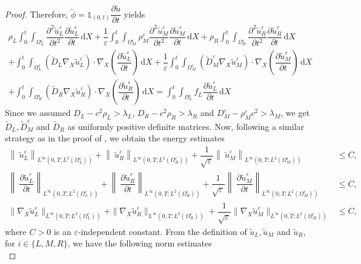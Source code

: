 \documentclass[11pt]{article}
\def\es{\varepsilon}
\def\orr{\Omega_R^\varepsilon}
\def\omm{\Omega_M^\varepsilon}
\def\oll{\Omega_L^\varepsilon}
\def\p{\partial}
\newcommand{\di}[1]{\,\mathrm{d}#1}
\begin{document}
\begin{proof}
Therefore, $\widetilde{\phi}=\mathds{1}_{(0,t)}\dfrac{\p \widetilde{u}}{\p t}$ yields
\begin{multline*}
	    {\rho_L}\int_0^t\int_{\oll}\dfrac{\p^2 \widetilde{u}_{L}^\es}{\p t^2}\dfrac{\p \widetilde{u}_{L}^\es}{\p t} \di{X}+\dfrac{1}{\es}\int_0^t\int_{\omm}\rho_M^\es  \dfrac{\p^2 \widetilde{u}_{M}^\es}{\p t^2} \dfrac{\p \widetilde{u}_{M}^\es}{\p t} \di{X}
        +\rho_R\int_0^t\int_{\orr} \dfrac{\p^2 \widetilde{u}_{R}^\es}{\p t^2}\dfrac{\p \widetilde{u}_{R}^\es}{\p t}\di{X}\\
        +\int_0^t\int_{\oll}(\widetilde{D}_L \nabla_X \widetilde{u}_L^\es)\cdot\nabla_X \left(\dfrac{\p \widetilde{u}_{L}^\es}{\p t}\right) \di{X}+\dfrac{1}{\es}\int_0^t\int_{\omm}\left(\widetilde{D}_M^\es \nabla_X \widetilde{u}_M^\es\right)\cdot\nabla_X \left(\dfrac{\p \widetilde{u}_{M}^\es}{\p t}\right)\di{X}\\
        +\int_0^t\int_{\orr}(\widetilde{D}_R \nabla_X \widetilde{u}_R^\es)\cdot\nabla_X \left(\dfrac{\p \widetilde{u}_{R}^\es}{\p t}\right) \di{X}=\int_0^t\int_{\oll}f_L\dfrac{\p \widetilde{u}_{L}^\es}{\p t}\di{X}
	\end{multline*}
Since we assumed $D_{L}-c^2\rho_{L}>\lambda_L$, $D_{R}-c^2\rho_{R}>\lambda_R$ and $D_M^\es-\rho_M^\es c^2>\lambda_M$, we get  $\widetilde{D}_L, \widetilde{D}_M^\es$ and $\widetilde{D}_R$ as uniformly positive definite matrices. Now, following a similar strategy as in the proof of , we obtain the energy estimates 
\begin{subequations}
\begin{align}
     \left\|\ \widetilde{u}_L^\es\right\|_{L^{\infty}(0,T;L^2(\oll))}+  \left\|\ \widetilde{u}_R^\es\right\|_{L^{\infty}(0,T;L^2(\orr))}+  \dfrac{1}{\sqrt{\es}}\left\|\ \widetilde{u}_M^\es\right\|_{L^{\infty}(0,T;L^2(\omm))}&\leq C,\label{eq:energy_estimate_1_in_moving_coordinate}\\
	    \left\|\ \dfrac{\partial \widetilde{u}_L^\es}{\partial t}\right\|_{L^{\infty}(0,T;L^2(\oll))}+  \left\|\ \dfrac{\partial \widetilde{u}_R^\es}{\partial t}\right\|_{L^{\infty}(0,T;L^2(\orr))}+  \dfrac{1}{\sqrt{\es}}\left\|\ \dfrac{\partial \widetilde{u}_M^\es}{\partial t}\right\|_{L^{\infty}(0,T;L^2(\omm))}&\leq C,\\
	    \|\nabla_X \widetilde{u}_L^\es\|_{L^{\infty}(0,T;L^2(\oll))}+\|\nabla_X\widetilde{u}_R^\es\|_{L^{\infty}(0,T;L^2(\orr))}+\dfrac{1}{\sqrt{\es}}\|\nabla_X\widetilde{u}_M^\es\|_{L^{\infty}(0,T;L^2(\omm))}&\leq C,\label{eq:energy_estimate_3_in_moving_coordinate}
	\end{align}
    \end{subequations}
    where $C>0$ is an $\es$-independent constant. From the definition of $\widetilde{u}_{L},\widetilde{u}_{M}$  and $\widetilde{u}_{R}$, for $i\in\{L,M,R\}$,  we have the following norm estimates
    \begin{subequations}
        

\end{subequations}
\end{proof}
\end{document}
